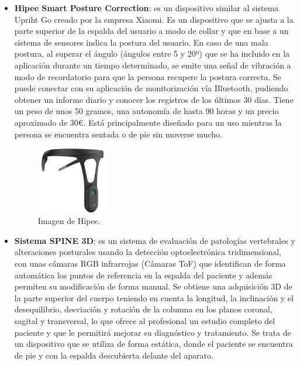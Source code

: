 \begin{itemize}
    \item \textbf{Hipee Smart Posture Correction}\cite{Hipee1,Hipee2}: es un dispositivo similar al sistema Upriht Go creado por la empresa Xiaomi\cite{Xiaomi}. Es un dispositivo que se ajusta a la parte superior de la espalda del usuario a modo de collar y que en base a un sistema de sensores indica la postura del usuario. En caso de una mala postura, al superar el ángulo (ángulos entre 5 y 20º) que se ha incluido en la aplicación durante un tiempo determinado, se emite una señal de vibración a modo de recordatorio para que la persona recupere la postura correcta. Se puede conectar con su aplicación de monitorización vía Bluetooth, pudiendo obtener un informe diario y conocer los registros de los últimos 30 días. Tiene un peso de unos 50 gramos, una autonomía de hasta 90 horas y un precio aproximado de 30€. Está principalmente diseñado para un uso mientras la persona se encuentra sentada o de pie sin moverse mucho. 
\begin{figure}[h!]
    \centering
    \includegraphics[width=0.3\textwidth]{img/imghipee.jpg}
    \caption{Imagen de Hipee.\cite{Hipee3}}
    \label{fig:imgHipee} 
\end{figure}

    \item \textbf{Sistema SPINE 3D}\cite{SPINE3D}: es un sistema de evaluación de patologías vertebrales y alteraciones posturales usando la detección optoelectrónica tridimensional, con unas cámaras RGB infrarrojas (Cámaras ToF) que identifican de forma automática los puntos de referencia en la espalda del paciente y además permiten su modificación de forma manual. Se obtiene una adquisición 3D de la parte superior del cuerpo teniendo en cuenta la longitud, la inclinación y el desequilibrio, desviación y rotación de la columna en los planos coronal, sagital y transversal, lo que ofrece al profesional un estudio completo del paciente y que le permitirá mejorar su diagnóstico y tratamiento. Se trata de un dispositivo que se utiliza de forma estática, donde el paciente se encuentra de pie y con la espalda descubierta delante del aparato. 


\end{itemize}
